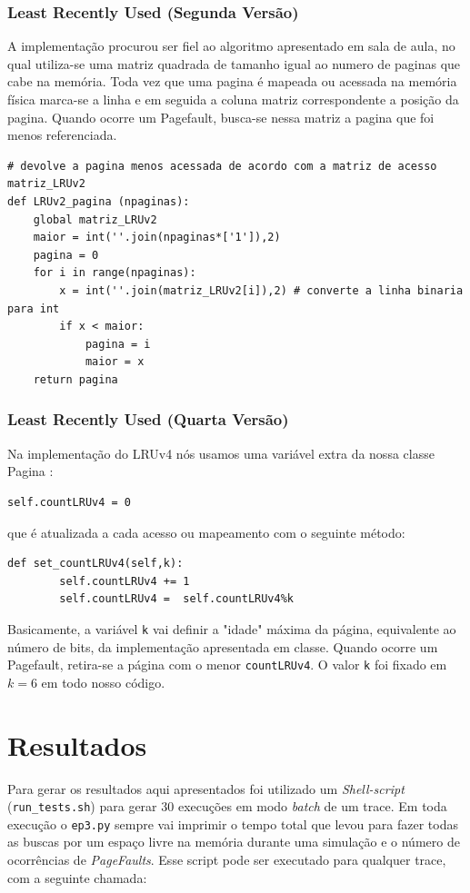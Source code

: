 \documentclass[12pt,a4paper]{article}
\begin{document}
\subsubsection{Least Recently Used (Segunda Versão)}
A implementação procurou ser fiel ao algoritmo apresentado em sala de aula, no qual utiliza-se uma matriz quadrada de tamanho igual ao numero de paginas que cabe na memória. Toda vez que uma pagina é mapeada ou acessada na memória física marca-se a linha e em seguida a coluna matriz correspondente a posição da pagina. Quando ocorre um Pagefault, busca-se nessa matriz a pagina que foi menos referenciada.
\begin{lstlisting}
# devolve a pagina menos acessada de acordo com a matriz de acesso matriz_LRUv2
def LRUv2_pagina (npaginas):
    global matriz_LRUv2
    maior = int(''.join(npaginas*['1']),2) 
    pagina = 0
    for i in range(npaginas):
        x = int(''.join(matriz_LRUv2[i]),2) # converte a linha binaria para int
        if x < maior:
            pagina = i 
            maior = x
    return pagina
\end{lstlisting}

\subsubsection{Least Recently Used (Quarta Versão)}
Na implementação do LRUv4 nós usamos uma variável extra da nossa classe Pagina :
\begin{lstlisting}
self.countLRUv4 = 0  
\end{lstlisting}

que é atualizada a cada acesso ou mapeamento com o seguinte método:
\begin{lstlisting}
def set_countLRUv4(self,k):
        self.countLRUv4 += 1
        self.countLRUv4 =  self.countLRUv4%k
\end{lstlisting}

Basicamente, a variável \texttt{k} vai definir a "idade" máxima da página, equivalente ao número de bits, da implementação apresentada em classe. Quando ocorre um Pagefault, retira-se a página com o menor \texttt{countLRUv4}. O valor \texttt{k} foi fixado em $k=6$ em todo nosso código.

\section{Resultados}

Para gerar os resultados aqui apresentados foi utilizado um \textit{Shell-script} (\texttt{run\_tests.sh}) para gerar 30 execuções em modo \textit{batch} de um trace. Em toda execução o \texttt{ep3.py} sempre vai imprimir o tempo total que levou para fazer todas as buscas por um espaço livre na memória durante uma simulação e o número de ocorrências de \textit{PageFaults}. Esse script pode ser executado para qualquer trace, com a seguinte chamada:
\end{document}

